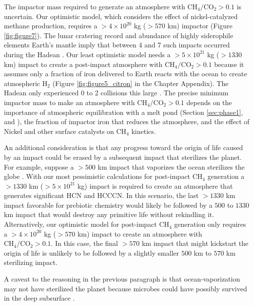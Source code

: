 The impactor mass required to generate an atmosphere with $\mathrm{CH_4}/\mathrm{CO_2} > 0.1$ is uncertain. Our optimistic model, which considers the effect of nickel-catalyzed methane production, requires a $> 4 \times 10^{20}$ kg ($> 570$ km) impactor (Figure \ref{fig:figure7}). The lunar cratering record and abundance of highly siderophile elements Earth's mantle imply that between 4 and 7 such impacts occurred during the Hadean \citep{Marchi_2014, Zahnle_2020}. Our least optimistic model needs a $> 5 \times 10^{21}$ kg ($> 1330$ km) impact to create a post-impact atmosphere with $\mathrm{CH_4}/\mathrm{CO_2} > 0.1$ because it assumes only a fraction of iron delivered to Earth reacts with the ocean to create atmospheric H$_2$ (Figure \ref{fig:figure5_citron} in the Chapter Appendix). The Hadean only experienced 0 to 2 collisions this large \citep{Zahnle_2020}. The precise minimum impactor mass to make an atmosphere with $\mathrm{CH_4}/\mathrm{CO_2} > 0.1$ depends on the importance of atmospheric equilibration with a melt pond (Section \ref{sec:phase1}, and \citet{Itcovitz_2022}), the fraction of impactor iron that reduces the atmosphere, and the effect of Nickel and other surface catalysts on CH$_4$ kinetics.

An additional consideration is that any progress toward the origin of life caused by an impact could be erased by a subsequent impact that sterilizes the planet. For example, suppose a $> 500$ km impact that vaporizes the ocean sterilizes the globe \citep{Citron_2022}. With our most pessimistic calculations for post-impact CH$_4$ generation a $> 1330$ km ($> 5 \times 10^{21}$ kg) impact is required to create an atmosphere that generates significant HCN and HCCCN. In this scenario, the last $> 1330$ km impact favorable for prebiotic chemistry would likely be followed by a $500$ to $1330$ km impact that would destroy any primitive life without rekindling it. Alternatively, our optimistic model for post-impact CH$_4$ generation only requires a $> 4 \times 10^{20}$ kg ($> 570$ km) impact to create an atmosphere with $\mathrm{CH_4}/\mathrm{CO_2} > 0.1$. In this case, the final $> 570$ km impact that might kickstart the origin of life is unlikely to be followed by a slightly smaller $500$ km to $570$ km sterilizing impact.

A caveat to the reasoning in the previous paragraph is that ocean-vaporization may not have sterilized the planet because microbes could have possibly survived in the deep subsurface \citep{Sleep_1989,Grimm_2018}. 

